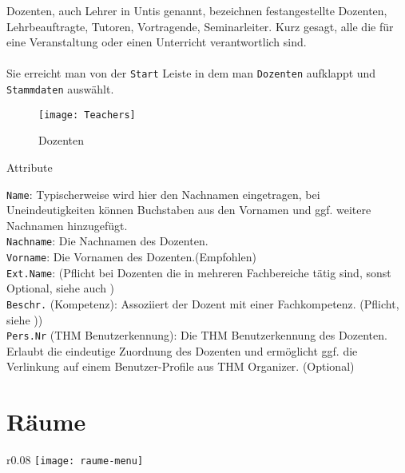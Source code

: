 \vspace{25pt}

Dozenten, auch Lehrer in Untis genannt, bezeichnen festangestellte Dozenten, Lehrbeauftragte, Tutoren, Vortragende, Seminarleiter. Kurz gesagt, alle die für eine Veranstaltung oder einen Unterricht verantwortlich sind.\\
\\
Sie erreicht man von der \texttt{Start} Leiste in dem man \texttt{Dozenten} aufklappt und \texttt{Stammdaten} auswählt.\\

\begin{figure}[h]
	\centering
	\texttt{[image: Teachers]}
	\vspace{-5pt}
	\caption{Dozenten}
	\label{fig:teachers}
\end{figure}

\noindent
{\large Attribute\par}
\vspace{8pt}

\noindent
\texttt{Name}: Typischerweise wird hier den Nachnamen eingetragen, bei Uneindeutigkeiten können Buchstaben aus den Vornamen und ggf. weitere Nachnamen hinzugefügt.\\

\noindent
\texttt{Nachname}: Die Nachnamen des Dozenten.\\

\noindent
\texttt{Vorname}: Die Vornamen des Dozenten.(Empfohlen)\\

\noindent
\texttt{Ext.Name}: (Pflicht bei Dozenten die in mehreren Fachbereiche tätig sind, sonst Optional, siehe auch 
)\\

\noindent
\texttt{Beschr.} (Kompetenz): Assoziiert der Dozent mit einer Fachkompetenz. (Pflicht, siehe   ))\\

\noindent
\texttt{Pers.Nr} (THM Benutzerkennung): Die THM Benutzerkennung des Dozenten. Erlaubt die eindeutige Zuordnung des Dozenten und ermöglicht ggf. die Verlinkung auf einem Benutzer-Profile aus THM Organizer. (Optional)\\

\section{Räume}

\begin{wrapfigure}{r}{0.08\textwidth}
	\vspace{-80pt}
	\texttt{[image: raume-menu]}
\end{wrapfigure}

